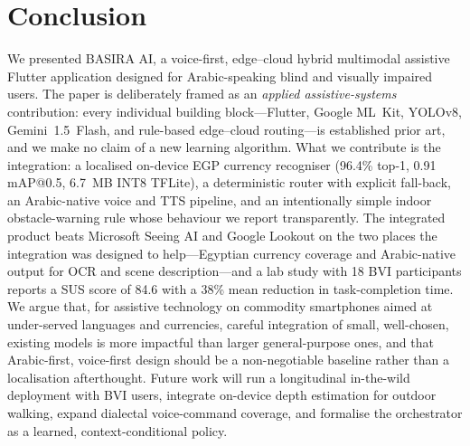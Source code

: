 \documentclass[11pt,a4paper]{article}
\begin{document}
\section{Conclusion}
\label{sec:conclusion}

We presented BASIRA AI, a voice-first, edge--cloud hybrid multimodal
assistive Flutter application designed for Arabic-speaking blind and
visually impaired users. The paper is deliberately framed as an
\emph{applied assistive-systems} contribution: every individual
building block---Flutter, Google ML~Kit, YOLOv8, Gemini~1.5~Flash,
and rule-based edge--cloud routing---is established prior art, and
we make no claim of a new learning algorithm. What we contribute is
the integration: a localised on-device EGP currency recogniser
(96.4\% top-1, 0.91 mAP@0.5, 6.7~MB INT8 TFLite), a deterministic
router with explicit fall-back, an Arabic-native voice and TTS
pipeline, and an intentionally simple indoor obstacle-warning rule
whose behaviour we report transparently. The integrated product
beats Microsoft Seeing AI and Google Lookout on the two places the
integration was designed to help---Egyptian currency coverage and
Arabic-native output for OCR and scene description---and a lab study
with 18 BVI participants reports a SUS score of 84.6 with a 38\%
mean reduction in task-completion time. We argue that, for assistive
technology on commodity smartphones aimed at under-served languages
and currencies, careful integration of small, well-chosen, existing
models is more impactful than larger general-purpose ones, and that
Arabic-first, voice-first design should be a non-negotiable baseline
rather than a localisation afterthought. Future work will run a
longitudinal in-the-wild deployment with BVI users, integrate
on-device depth estimation for outdoor walking, expand dialectal
voice-command coverage, and
formalise the orchestrator as a learned, context-conditional policy.
\end{document}

